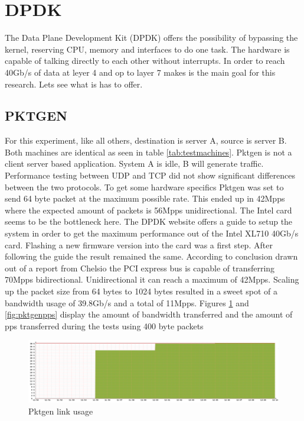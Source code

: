 \section{DPDK}
The Data Plane Development Kit (DPDK) offers the possibility of bypassing the kernel, reserving CPU, memory and interfaces to do one task. The hardware is capable of talking directly to each other without interrupts. In order to reach 40Gb/s of data at leyer 4 and op to layer 7 makes is the main goal for this research. Lets see what is has to offer. 

\subsection{PKTGEN}
For this experiment, like all others, destination is server A, source is server B. Both machines are identical as seen in table \ref{tab:testmachines}. Pktgen is not a client server based application. System A is idle, B will generate traffic. Performance testing between UDP and TCP did not show significant differences between the two protocols. To get some hardware specifics Pktgen was set to send 64 byte packet at the maximum possible rate. This ended up in 42Mpps where the expected amount of packets is 56Mpps unidirectional. The Intel card seems to be the bottleneck here. The DPDK website offers a guide to setup the system in order to get the maximum performance out of the Intel XL710 40Gb/s card. Flashing a new firmware version into the card was a first step. After following the guide the result remained the same. According to conclusion drawn out of a report from Chelsio \cite{chelsio} the PCI express bus is capable of transferring 70Mpps bidirectional. Unidirectional it can reach a maximum of 42Mpps. Scaling up the packet size from 64 bytes to 1024 bytes resulted in a sweet spot of a bandwidth usage of 39.8Gb/s and a total of 11Mpps. Figures \ref{fig:pktgenlink} and \ref{fig:pktgenpps} display the amount of bandwidth transferred and the amount of pps transferred during the tests using 400 byte packets

\begin{figure}
  \includegraphics[scale=0.35]{images/pktgen_link_usage.png}
  \caption{Pktgen link usage}
  \label{fig:pktgenlink}
\end{figure}

